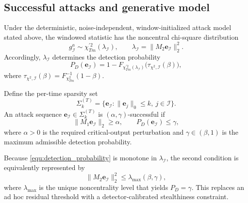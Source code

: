 \subsection{Successful attacks and generative model}
Under the deterministic, noise-independent, window-initialized attack model stated above, the windowed statistic has the noncentral chi-square distribution
\begin{equation}\label{equ:noncentral_chisq}
g_{\mathcal I}^a\sim\chi_{Tm}^{\prime 2}(\lambda_{\mathcal I}),\qquad
\lambda_{\mathcal I}=\|M_2\mathbf{e}_{\mathcal I}\|_2^2.
\end{equation}
Accordingly, $\lambda_{\mathcal I}$ determines the detection probability
\begin{equation}\label{equ:detection_probability}
P_D(\mathbf{e}_{\mathcal I})
=1-F_{\chi_{Tm}^{\prime 2}(\lambda_{\mathcal I})}
\big(\tau_{\chi^2,\mathcal I}(\beta)\big),
\end{equation}
where $\tau_{\chi^2,\mathcal I}(\beta)=F_{\chi^2_{Tm}}^{-1}(1-\beta)$.

\begin{definition}\label{Def:Successful_FDIA}
Define the per-time sparsity set
\[
\Sigma_k^{(T)}=\{\mathbf{e}_{\mathcal I}:
\|\mathbf{e}_j\|_0\le k,\ j\in\mathcal I\}.
\]
An attack sequence $\mathbf{e}_{\mathcal I}\in\Sigma_k^{(T)}$ is $(\alpha,\gamma)$-successful if
\begin{equation}\label{equ:def_success_FDIA}
\|M_1\mathbf{e}_{\mathcal I}\|_2\ge\alpha,
\qquad
P_D(\mathbf{e}_{\mathcal I})\le\gamma,
\end{equation}
where $\alpha>0$ is the required critical-output perturbation and $\gamma\in(\beta,1)$ is the maximum admissible detection probability.
\end{definition}
Because \eqref{equ:detection_probability} is monotone in $\lambda_{\mathcal I}$, the second condition is equivalently represented by
\begin{equation}\label{equ:lambda_max}
\|M_2\mathbf{e}_{\mathcal I}\|_2^2\le\lambda_{\max}(\beta,\gamma),
\end{equation}
where $\lambda_{\max}$ is the unique noncentrality level that yields $P_D=\gamma$. This replaces an ad hoc residual threshold with a detector-calibrated stealthiness constraint.

